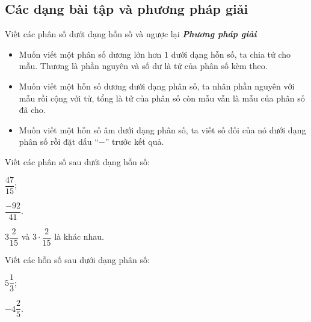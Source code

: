 \subsection{Các dạng bài tập và phương pháp giải}
\begin{dang}{Viết các phân số dưới dạng hỗn số và ngược lại}
\textbf{\textit{Phương pháp giải}}
\begin{itemize}
\item Muốn viết một phân số dương lớn hơn $1$ dưới dạng hỗn số, ta chia tử cho mẫu. Thương là phần nguyên và số dư là tử của phân số kèm theo.
\item Muốn viết một hỗn số dương dưới dạng phân số, ta nhân phần nguyên với mẫu rồi cộng với tử, tổng là tử của phân số còn mẫu vẫn là mẫu của phân số đã cho.
\item Muốn viết một hỗn số âm dưới dạng phân số, ta viết số đối của nó dưới dạng phân số rồi đặt dấu ``$-$'' trước kết quả.
\end{itemize}
\end{dang}
\begin{vd} %
Viết các phân số sau dưới dạng hỗn số:
\begin{listEX}[2]
\item $\dfrac{47}{15};$
\item $\dfrac{-92}{41}.$
\end{listEX}
\begin{note}
$3\dfrac{2}{15}$ và $3\cdot\dfrac{2}{15}$ là khác nhau.
\end{note}
\end{vd}
\begin{vd} %
Viết các hỗn số sau dưới dạng phân số:\\
\begin{listEX}[2]
\item $5\dfrac{1}{3};$
\item $-4\dfrac{2}{5}.$
\end{listEX}
\end{vd}
